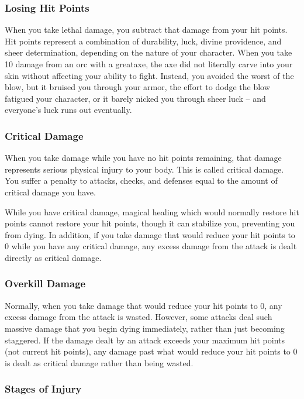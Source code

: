 \subsubsection{Losing Hit Points}
When you take lethal damage, you subtract that damage from your hit points.
 Hit points represent a combination of durability, luck, divine providence, and sheer determination, depending on the nature of your character. When you take 10 damage from an orc with a greataxe, the axe did not literally carve into your skin without affecting your ability to fight. Instead, you avoided the worst of the blow, but it bruised you through your armor, the effort to dodge the blow fatigued your character, or it barely nicked you through sheer luck -- and everyone's luck runs out eventually.

\subsubsection{Critical Damage}\label{Critical Damage}
When you take damage while you have no hit points remaining, that damage represents serious physical injury to your body. This is called critical damage. You suffer a penalty to attacks, checks, and defenses equal to the amount of critical damage you have.

While you have critical damage, magical healing which would normally restore hit points cannot restore your hit points, though it can stabilize you, preventing you from dying. In addition, if you take damage that would reduce your hit points to 0 while you have any critical damage, any excess damage from the attack is dealt directly as critical damage.

\subsubsection{Overkill Damage}
Normally, when you take damage that would reduce your hit points to 0, any excess damage from the attack is wasted. However, some attacks deal such massive damage that you begin dying immediately, rather than just becoming staggered. If the damage dealt by an attack exceeds your maximum hit points (not current hit points), any damage past what would reduce your hit points to 0 is dealt as critical damage rather than being wasted.

\subsubsection{Stages of Injury}

